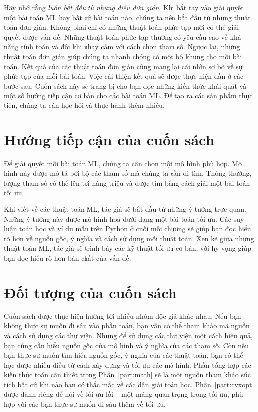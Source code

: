 Hãy nhớ rằng \textit{luôn bắt đầu từ những điều đơn giản}. Khi bắt tay vào giải
quyết một bài toán ML hay bất cứ bài toán nào, chúng ta nên bắt đầu từ những
thuật toán đơn giản. Không phải chỉ có những thuật toán phức tạp mới có thể
giải quyết được vấn đề. Những thuật toán phức tạp thường có yêu cầu cao về khả
năng tính toán và đôi khi nhạy cảm với cách chọn tham số. Ngược lại, những
thuật toán đơn giản giúp chúng ta nhanh chóng có một bộ khung cho mỗi bài
toán. Kết quả của các thuật toán đơn giản cũng mang lại cái nhìn sơ bộ về sự
phức tạp của mỗi bài toán. Việc cải thiện kết quả sẽ được thực hiện dần ở các
bước sau. Cuốn sách này sẽ trang bị cho bạn đọc những kiến thức khái quát và một
số hướng tiếp cận cơ bản cho các bài toán ML. Để tạo ra các sản phẩm thực tiễn,
chúng ta cần học hỏi và thực hành thêm nhiều.


\section{Hướng tiếp cận của cuốn sách}

Để giải quyết mỗi bài toán ML, chúng ta cần chọn một mô hình phù hợp. Mô hình
này được mô tả bởi bộ các tham số mà chúng ta cần đi tìm. Thông thường, lượng
tham số có thể lên tới hàng triệu và được tìm bằng cách giải một bài toán tối
ưu.

Khi viết về các thuật toán ML, tác giả sẽ bắt đầu từ những ý tưởng trực quan.
Những ý tưởng này được mô hình hoá dưới dạng một bài toán tối ưu. Các suy luận
toán học và ví dụ mẫu trên Python ở cuối mỗi chương sẽ giúp bạn đọc hiểu rõ hơn
về nguồn gốc, ý nghĩa và cách sử dụng mỗi thuật toán. Xen kẽ giữa những thuật
toán ML, tác giả sẽ trình bày các kỹ thuật tối ưu cơ bản, với hy vọng giúp bạn
đọc hiểu rõ hơn bản chất của vấn đề.
\section{Đối tượng của cuốn sách}
Cuốn sách được thực hiện hướng tới nhiều nhóm độc giả khác nhau. Nếu bạn không
thực sự muốn đi sâu vào phần toán, bạn vẫn có thể tham khảo mã nguồn và cách sử
dụng các thư viện. Nhưng để sử dụng các thư viện một cách hiệu quả, bạn cũng cần
hiểu nguồn gốc của mô hình và ý nghĩa của các tham số. Còn nếu bạn thực sự muốn
tìm hiểu nguồn gốc, ý nghĩa của các thuật toán, bạn có thể học được nhiều điều
từ cách xây dựng và tối ưu các mô hình. Phần tổng hợp các kiến thức toán cần
thiết trong Phần~\ref{part:math} sẽ là một nguồn tham khảo súc tích bất cứ khi
nào bạn có thắc mắc về các dẫn giải toán học. Phần~\ref{part:cvxopt} được dành
riêng để nói về tối ưu lồi -- một mảng quan trọng trong tối ưu, phù hợp với các
bạn thực sự muốn đi sâu thêm về tối ưu.


